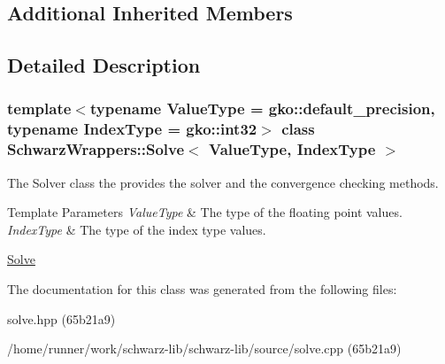 \subsection*{Additional Inherited Members}


\subsection{Detailed Description}
\subsubsection*{template$<$typename Value\+Type = gko\+::default\+\_\+precision, typename Index\+Type = gko\+::int32$>$\newline
class Schwarz\+Wrappers\+::\+Solve$<$ Value\+Type, Index\+Type $>$}

The Solver class the provides the solver and the convergence checking methods. 


\begin{DoxyTemplParams}{Template Parameters}
{\em Value\+Type} & The type of the floating point values. \\
\hline
{\em Index\+Type} & The type of the index type values.\\
\hline
\end{DoxyTemplParams}
\hyperlink{group__solve}{Solve} 

The documentation for this class was generated from the following files\+:\begin{DoxyCompactItemize}
\item 
solve.\+hpp (65b21a9)\item 
/home/runner/work/schwarz-\/lib/schwarz-\/lib/source/solve.\+cpp (65b21a9)\end{DoxyCompactItemize}
